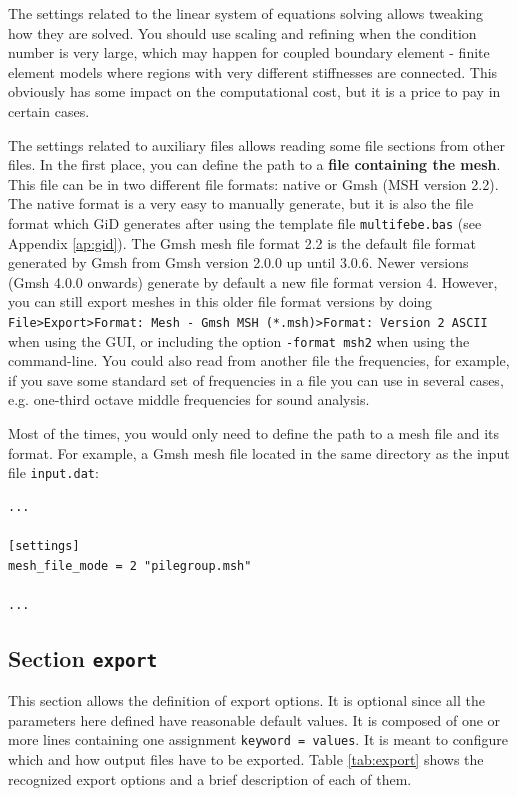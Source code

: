 \documentclass[a4paper,fleqn]{book}
\begin{document}
The settings related to the linear system of equations solving allows tweaking how they are solved. You should use scaling and refining when the condition number is very large, which may happen for coupled boundary element - finite element models where regions with very different stiffnesses are connected. This obviously has some impact on the computational cost, but it is a price to pay in certain cases.

The settings related to auxiliary files allows reading some file sections from other files. In the first place, you can define the path to a \textbf{file containing the mesh}. This file can be in two different file formats: native or Gmsh (MSH version 2.2). The native format is a very easy to manually generate, but it is also the file format which GiD generates after using the template file \texttt{multifebe.bas} (see Appendix \ref{ap:gid}). The Gmsh mesh file format 2.2 is the default file format generated by Gmsh from Gmsh version 2.0.0 up until 3.0.6. Newer versions (Gmsh 4.0.0 onwards) generate by default a new file format version 4. However, you can still export meshes in this older file format versions by doing \texttt{File>Export>Format: Mesh - Gmsh MSH (*.msh)>Format: Version 2 ASCII} when using the GUI, or including the option \texttt{-format msh2} when using the command-line. You could also read from another file the frequencies, for example, if you save some standard set of frequencies in a file you can use in several cases, e.g. one-third octave middle frequencies for sound analysis.

Most of the times, you would only need to define the path to a mesh file and its format. For example, a Gmsh mesh file located in the same directory as the input file \texttt{input.dat}:

\begin{Verbatim}[frame=single, fontsize=\small, label=input.dat]
...

[settings]
mesh_file_mode = 2 "pilegroup.msh"

...
\end{Verbatim} 

\subsection{Section \texttt{export}}
\label{sec:export}

This section allows the definition of export options. It is optional since all the parameters here defined have reasonable default values. It is composed of one or more lines containing one assignment \texttt{keyword = values}. It is meant to configure which and how output files have to be exported. Table \ref{tab:export} shows the recognized export options and a brief description of each of them.
\end{document}
